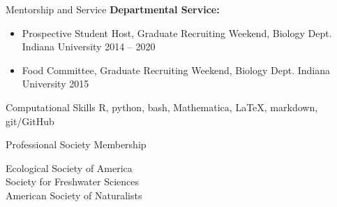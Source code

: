 \documentclass{resume} %
\begin{document}
\begin{rSection}{Mentorship and Service}
{\bf Departmental Service:}
\begin{itemize}
  \item Prospective Student Host, Graduate Recruiting Weekend, Biology Dept. Indiana University \hfill 2014 -- 2020
  \item Food Committee, Graduate Recruiting Weekend, Biology Dept. Indiana University \hfill 2015 
\end{itemize}

\end{rSection}
\bigskip

\begin{rSection}{Computational Skills}
R, python, bash, Mathematica, \LaTeX, markdown, git/GitHub 

\end{rSection}

\bigskip

\begin{rSection}{Professional Society Membership}

Ecological Society of America\\
Society for Freshwater Sciences\\
American Society of Naturalists\\ 

\end{rSection}

% 
% 
% 
% 
\end{document}
